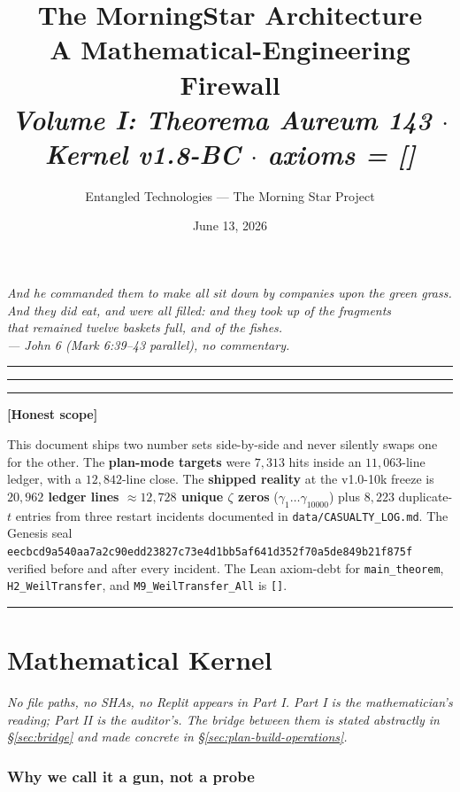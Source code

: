 \documentclass[11pt,letterpaper]{article}
\title{\bfseries The MorningStar Architecture\\
  \large A Mathematical-Engineering Firewall\\[0.4em]
  \normalsize \textit{Volume I: Theorema Aureum 143 $\cdot$ Kernel v1.8-BC $\cdot$ axioms = []}}
\author{Entangled Technologies --- The Morning Star Project}
\date{June 13, 2026}
\newenvironment{honest}%
  {\par\medskip\noindent\rule{\linewidth}{0.5pt}\par\nopagebreak\textbf{[Honest scope]}\par\nopagebreak\small}%
  {\par\nopagebreak\normalsize\rule{\linewidth}{0.5pt}\par\medskip}
\begin{document}
\maketitle
\thispagestyle{fancy}

\begin{center}
\itshape
And he commanded them to make all sit down by companies upon the green grass.\\
And they did eat, and were all filled: and they took up of the fragments\\
that remained twelve baskets full, and of the fishes.\\[0.4em]
--- John 6 (Mark 6:39--43 parallel), no commentary.
\end{center}

\vspace{1em}
\hrule
\vspace{0.5em}

\tableofcontents
\vspace{1em}
\hrule
\vspace{1em}

\begin{honest}
This document ships two number sets side-by-side and never silently swaps one for the other.
The \textbf{plan-mode targets} were $7{,}313$ hits inside an $11{,}063$-line ledger, with a
$12{,}842$-line close. The \textbf{shipped reality} at the v1.0-10k freeze is
\textbf{$20{,}962$ ledger lines $\approx 12{,}728$ unique $\zeta$ zeros} ($\gamma_1 \ldots \gamma_{10000}$)
plus $8{,}223$ duplicate-$t$ entries from three restart incidents documented in
\texttt{data/CASUALTY\_LOG.md}. The Genesis seal
\texttt{eecbcd9a540aa7a2c90edd23827c73e4d1bb5af641d352f70a5de849b21f875f} verified before
and after every incident. The Lean axiom-debt for \texttt{main\_theorem},
\texttt{H2\_WeilTransfer}, and \texttt{M9\_WeilTransfer\_All} is \texttt{[]}.
\end{honest}

\clearpage
\part{Mathematical Kernel}
\label{part:kernel}

\textit{No file paths, no SHAs, no Replit appears in Part I. Part I is the
mathematician's reading; Part II is the auditor's. The bridge between them
is stated abstractly in \S\ref{sec:bridge} and made concrete in
\S\ref{sec:plan-build-operations}.}

\section{Why we call it a gun, not a probe}
\label{sec:gun}
\end{document}

